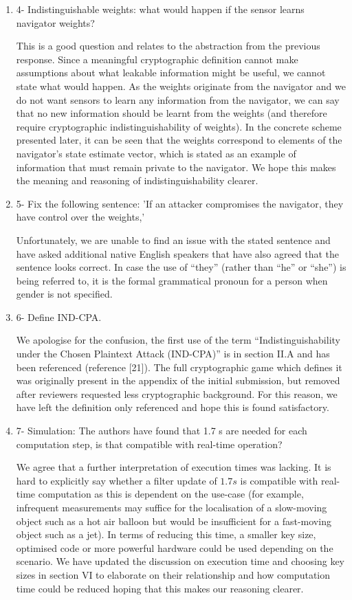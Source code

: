 \documentclass[a4paper]{scrartcl}
\newenvironment{rebuttal}{\begin{enumerate}[label={\color{grey}\thesection.\arabic{enumi}},leftmargin=0pt,ref=\thesection.\arabic{enumi}]}{\end{enumerate}}
\newcommand{\reviewtext}[1]{{\color{nblue} #1}}
\begin{document}
\begin{rebuttal}
\item \reviewtext{4- Indistinguishable weights: what would happen if the sensor learns navigator weights?}

This is a good question and relates to the abstraction from the previous response. Since a meaningful cryptographic definition cannot make assumptions about what leakable information might be useful, we cannot state what would happen. As the weights originate from the navigator and we do not want sensors to learn any information from the navigator, we can say that no new information should be learnt from the weights (and therefore require cryptographic indistinguishability of weights). In the concrete scheme presented later, it can be seen that the weights correspond to elements of the navigator's state estimate vector, which is stated as an example of information that must remain private to the navigator. We hope this makes the meaning and reasoning of indistinguishability clearer.

\item \reviewtext{5- Fix the following sentence: 'If an attacker compromises the navigator, they have control over the weights,'}

Unfortunately, we are unable to find an issue with the stated sentence and have asked additional native English speakers that have also agreed that the sentence looks correct. In case the use of ``they'' (rather than ``he'' or ``she'') is being referred to, it is the formal grammatical pronoun for a person when gender is not specified.

\item \reviewtext{6- Define IND-CPA.}

We apologise for the confusion, the first use of the term ``Indistinguishability under the Chosen Plaintext Attack (IND-CPA)'' is in section II.A and has been referenced (reference [21]). The full cryptographic game which defines it was originally present in the appendix of the initial submission, but removed after reviewers requested less cryptographic background. For this reason, we have left the definition only referenced and hope this is found satisfactory.

\item \reviewtext{7- Simulation: The authors have found that 1.7 s are needed for each
computation step, is that compatible with real-time operation?}

We agree that a further interpretation of execution times was lacking. It is hard to explicitly say whether a filter update of $1.7s$ is compatible with real-time computation as this is dependent on the use-case (for example, infrequent measurements may suffice for the localisation of a slow-moving object such as a hot air balloon but would be insufficient for a fast-moving object such as a jet). In terms of reducing this time, a smaller key size, optimised code or more powerful hardware could be used depending on the scenario. We have updated the discussion on execution time and choosing key sizes in section VI to elaborate on their relationship and how computation time could be reduced hoping that this makes our reasoning clearer.


\end{rebuttal}
\end{document}
